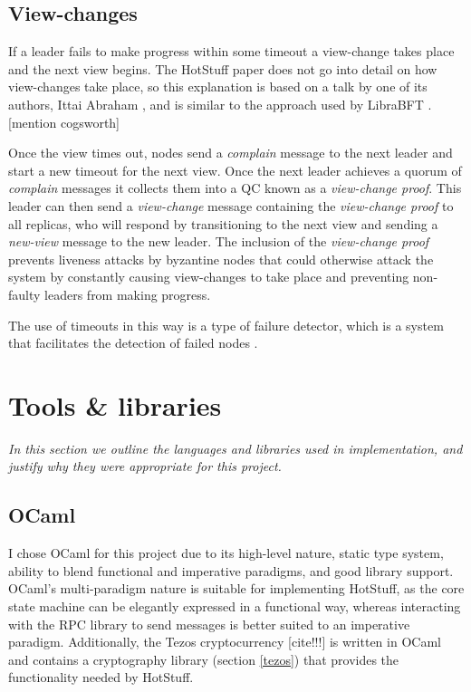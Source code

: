 \subsection{View-changes} \label{viewchange}
If a leader fails to make progress within some timeout a view-change takes place and the next view begins. The HotStuff paper does not go into detail on how view-changes take place, so this explanation is based on a talk by one of its authors, Ittai Abraham \cite{ittai}, and is similar to the approach used by LibraBFT \cite{baudet_state_nodate}. [mention cogsworth]

Once the view times out, nodes send a \textit{complain} message to the next leader and start a new timeout for the next view. Once the next leader achieves a quorum of \textit{complain} messages it collects them into a QC known as a \textit{view-change proof}. This leader can then send a \textit{view-change} message containing the \textit{view-change proof} to all replicas, who will respond by transitioning to the next view and sending a \textit{new-view} message to the new leader. The inclusion of the \textit{view-change proof} prevents liveness attacks by byzantine nodes that could otherwise attack the system by constantly causing view-changes to take place and preventing non-faulty leaders from making progress.

The use of timeouts in this way is a type of failure detector, which is a system that facilitates the detection of failed nodes \cite{chandra_weakest_1996}\cite{chandra_unreliable_1996}.

\section{Tools \& libraries} \label{tools}
\textit{In this section we outline the languages and libraries used in implementation, and justify why they were appropriate for this project.}

\subsection{OCaml}
I chose OCaml \cite{noauthor_ocaml_nodate} for this project due to its high-level nature, static type system, ability to blend functional and imperative paradigms, and good library support. OCaml's multi-paradigm nature is suitable for implementing HotStuff, as the core state machine can be elegantly expressed in a functional way, whereas interacting with the RPC library to send messages is better suited to an imperative paradigm. Additionally, the Tezos cryptocurrency [cite!!!] is written in OCaml and contains a cryptography library (section \ref{tezos}) that provides the functionality needed by HotStuff.

